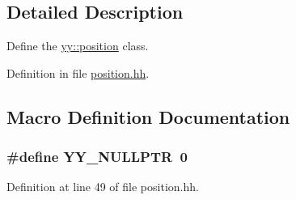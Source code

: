 \subsection{Detailed Description}
Define the \hyperlink{classyy_1_1position}{yy\-::position} class. 

Definition in file \hyperlink{position_8hh_source}{position.\-hh}.



\subsection{Macro Definition Documentation}
\hypertarget{position_8hh_a5a6c82f7ce4ad9cc8c6c08b7a2de5b84}{
\subsubsection[{Y\-Y\-\_\-\-N\-U\-L\-L\-P\-T\-R}]{\setlength{\rightskip}{0pt plus 5cm}\#define Y\-Y\-\_\-\-N\-U\-L\-L\-P\-T\-R~0}}\label{position_8hh_a5a6c82f7ce4ad9cc8c6c08b7a2de5b84}


Definition at line 49 of file position.\-hh.

